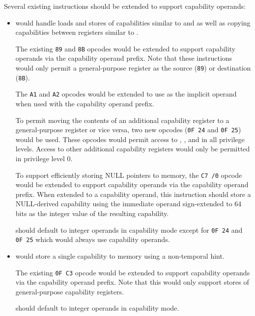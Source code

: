 Several existing instructions should be extended to support
capability operands:

\begin{itemize}
  \item {} would handle loads and stores of
    capabilities similar to  and  as well as
    copying capabilities between registers similar to .

    The existing \texttt{89} and \texttt{8B} opcodes would be extended
    to support capability operands via the capability operand prefix.
    Note that these instructions would only permit a general-purpose
    register as the source (\texttt{89}) or destination (\texttt{8B}).

    The \texttt{A1} and \texttt{A2} opcodes would be extended to use
    \CAX{} as the implicit operand when used with the capability
    operand prefix.

    To permit moving the contents of an additional capability register
    to a general-purpose register or vice versa, two
    new opcodes (\texttt{0F 24} and \texttt{0F 25}) would be
    used.  These opcodes would permit access to \CFS{}, \CGS{}, and
    \DDC{} in all privilege levels.  Access to other additional
    capability registers would only be permitted in privilege level 0.

    To support efficiently storing NULL pointers to memory, the \texttt{C7 /0}
    opcode would be extended to support capability operands via
    the capability operand prefix.  When extended to a capability
    operand, this instruction should store a NULL-derived capability
    using the immediate operand sign-extended to 64 bits as the
    integer value of the resulting capability.

     should default to integer operands in capability
    mode except for \texttt{0F 24} and \texttt{0F 25} which would
    always use capability operands.

  \item {} would store a single capability to memory
    using a non-temporal hint.

    The existing \texttt{0F C3} opcode would be extended to support
    capability operands via the capability operand prefix.  Note that
    this would only support stores of general-purpose capability
    registers.

     should default to integer operands in
    capability mode.


\end{itemize}
